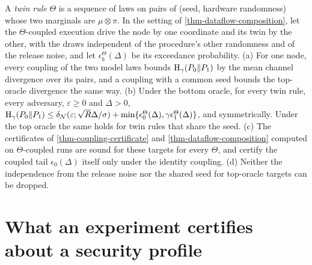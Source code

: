 \begin{theorem}
A \emph{twin rule} $\Theta$ is a sequence of laws on pairs of (seed, hardware
randomness) whose two marginals are $\mu\otimes\pi$. In the setting of
\cref{thm-dataflow-composition}, let the $\Theta$-coupled execution drive the node by
one coordinate and its twin by the other, with the draws independent of the
procedure's other randomness and of the release noise, and let $\epsilon^\Theta_b(\Delta)$
be its exceedance probability. (a) For one node, every coupling of the two model
laws bounds $\mathrm{H}_\gamma(P_0\|P_1)$ by the mean channel divergence over its pairs, and a
coupling with a common seed bounds the top-oracle divergence the same way. (b)
Under the bottom oracle, for every twin rule, every adversary, $\varepsilon\ge0$ and
$\Delta>0$, $\mathrm{H}_\gamma(P_0\|P_1)\le\delta_{\mathcal N}(\varepsilon;\sqrt R\Delta/\sigma)+\min\{\epsilon^\Theta_0(\Delta),\gamma\epsilon^\Theta_1(\Delta)\}$,
and symmetrically. Under the top oracle the same holds for twin rules that share
the seed. (c) The certificates of \cref{thm-coupling-certificate} and
\cref{thm-dataflow-composition} computed on $\Theta$-coupled runs are sound for these
targets for every $\Theta$, and certify the coupled tail $\epsilon_0(\Delta)$ itself only
under the identity coupling. (d) Neither the independence from the release noise
nor the shared seed for top-oracle targets can be dropped.
\end{theorem}

\section{What an experiment certifies about a security profile}

